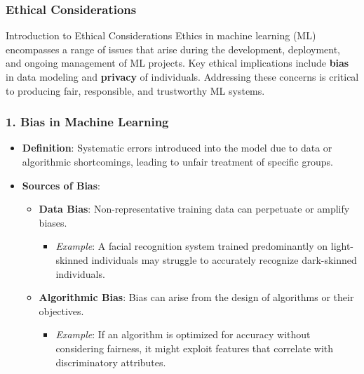 \documentclass[aspectratio=169]{beamer}
\begin{document}
\begin{frame}[fragile]
    \frametitle{Ethical Considerations}
    \begin{block}{Introduction to Ethical Considerations}
        Ethics in machine learning (ML) encompasses a range of issues that arise during the development, deployment, and ongoing management of ML projects. Key ethical implications include \textbf{bias} in data modeling and \textbf{privacy} of individuals. Addressing these concerns is critical to producing fair, responsible, and trustworthy ML systems.
    \end{block}
\end{frame}

\begin{frame}[fragile]
    \frametitle{1. Bias in Machine Learning}
    \begin{itemize}
        \item \textbf{Definition}: Systematic errors introduced into the model due to data or algorithmic shortcomings, leading to unfair treatment of specific groups.
        \item \textbf{Sources of Bias}:
        \begin{itemize}
            \item \textbf{Data Bias}: Non-representative training data can perpetuate or amplify biases.
            \begin{itemize}
                \item \textit{Example}: A facial recognition system trained predominantly on light-skinned individuals may struggle to accurately recognize dark-skinned individuals.
            \end{itemize}
            \item \textbf{Algorithmic Bias}: Bias can arise from the design of algorithms or their objectives.
            \begin{itemize}
                \item \textit{Example}: If an algorithm is optimized for accuracy without considering fairness, it might exploit features that correlate with discriminatory attributes.
            \end{itemize}
        \end{itemize}
    \end{itemize}
\end{frame}
\end{document}

